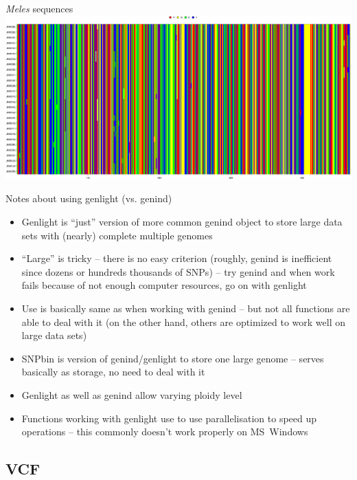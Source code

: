 \documentclass[compress, ucs, xelatex, 11pt, xcolor=svgnames,
  hyperref={
    bookmarks=true,
    unicode=true,
    colorlinks=true,
    pdftitle={Molecular data in R},
    plainpages=false,
    pdfauthor={Vojtech Zeisek},
    pdfsubject={Course about phylogeny and evolution in R},
    pdfcreator={XeLaTeX},
    pdfkeywords={R, evolution, phylogeny, molecular data},
    linkcolor=Tomato,
    anchorcolor=SaddleBrown,
    citecolor=Goldenrod,
    filecolor=DarkMagenta,
    menucolor=Sienna,
    urlcolor=DarkTurquoise,
    pdftex},
  url={hyphens, lowtilde} %
  ]{beamer}
\begin{document}
\begin{frame}{\textit{Meles} sequences}
  \includegraphics[width=\textwidth]{sequences_meles.png}
\end{frame}

\begin{frame}{Notes about using genlight (vs. genind)}
  \begin{itemize}
    \item Genlight is ``just'' version of more common genind object to store large data sets with (nearly) complete multiple genomes
    \item ``Large'' is tricky -- there is no easy criterion (roughly, genind is inefficient since dozens or hundreds thousands of SNPs) -- try genind and when work fails because of not enough computer resources, go on with genlight
    \item Use is basically same as when working with genind -- but not all functions are able to deal with it (on the other hand, others are optimized to work well on large data sets)
    \item SNPbin is version of genind/genlight to store one large genome -- serves basically as storage, no need to deal with it
    \item Genlight as well as genind allow varying ploidy level
    \item Functions working with genlight use to use parallelisation to speed up operations -- this commonly doesn't work properly on MS~Windows
  \end{itemize}
\end{frame}

\subsection{VCF}
\end{document}
